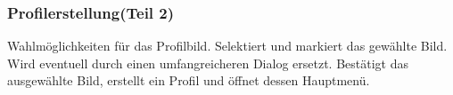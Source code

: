 \subsubsection{Profilerstellung(Teil 2)}
\begin{requirements}
 Wahlmöglichkeiten für das Profilbild. Selektiert und markiert das gewählte Bild. Wird eventuell durch einen umfangreicheren Dialog ersetzt.
 Bestätigt das ausgewählte Bild, erstellt ein Profil und öffnet dessen Hauptmenü.
\end{requirements}

